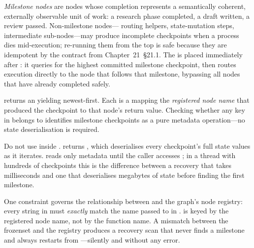 \emph{Milestone nodes} are nodes whose completion represents a
semantically coherent, externally observable unit of work: a research
phase completed, a draft written, a review passed. Non-milestone nodes---
routing helpers, state-mutation steps, intermediate sub-nodes---may
produce incomplete checkpoints when a process dies mid-execution; re-running
them from the top is safe because they are idempotent by the contract from
Chapter~21~\S21.1. The  is placed immediately after
: it queries  for the highest
committed milestone checkpoint, then routes execution directly to the node
that follows that milestone, bypassing all nodes that have already
completed safely.

 returns an 
yielding newest-first. Each  is
a  mapping the \emph{registered node name} that
produced the checkpoint to that node's return value. Checking whether any
key in  belongs to 
identifies milestone checkpoints as a pure metadata operation---no state
deserialisation is required.

\begin{warningbox}
Do not use  inside
.  returns
, which deserialises every checkpoint's
full state values as it iterates.  reads only metadata
until the caller accesses ; in a
thread with hundreds of checkpoints this is the difference between a
recovery that takes milliseconds and one that deserialises megabytes of
state before finding the first milestone.
\end{warningbox}

One constraint governs the relationship between 
and the graph's node registry: every string in 
must \emph{exactly} match the name passed to 
in .  is keyed by
the registered node name, not by the function name. A mismatch between
the frozenset and the registry produces a recovery scan that never finds a
milestone and always restarts from ---silently and without
any error.

